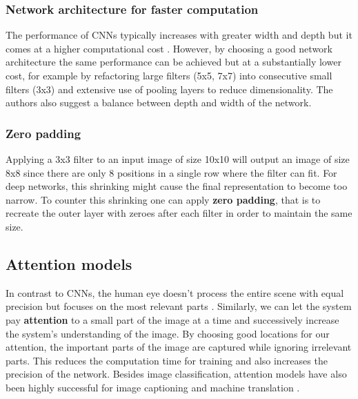 \subsubsection{Network architecture for faster computation}

The performance of CNNs typically increases with greater width and depth but it comes at a higher computational cost \cite{InceptionV3}. However, by choosing a good network architecture the same performance can be achieved but at a substantially lower cost, for example by refactoring large filters (5x5, 7x7) into consecutive small filters (3x3) and extensive use of pooling layers to reduce dimensionality. The authors also suggest a balance between depth and width of the network.

\subsubsection{Zero padding}

Applying a 3x3 filter to an input image of size 10x10 will output an image of size 8x8 since there are only 8 positions in a single row where the filter can fit. For deep networks, this shrinking might cause the final representation to become too narrow. To counter this shrinking one can apply \textbf{zero padding}, that is to recreate the outer layer with zeroes after each filter in order to maintain the same size.


\subsection{Attention models}



In contrast to CNNs, the human eye doesn't process the entire scene with equal precision but focuses on the most relevant parts \cite{DeepMindAttention}.
Similarly, we can let the system pay \textbf{attention} to a small part of the image at a time and successively increase the system's understanding of the image.
By choosing good locations for our attention, the important parts of the image are captured while ignoring irrelevant parts.
This reduces the computation time for training and also increases the precision of the network.
Besides image classification, attention models have also been highly successful for image captioning \cite{AttendAndTell} and machine translation \cite{machine_translation_attention}.

